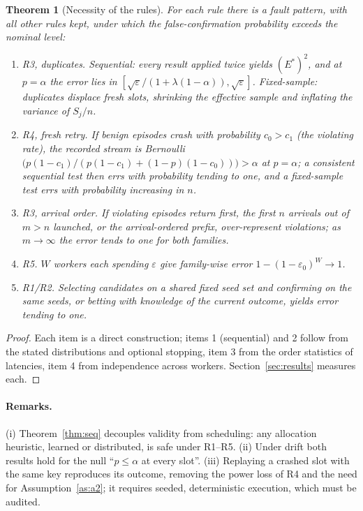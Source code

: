 \documentclass[11pt]{article}
\newtheorem{theorem}{Theorem}
\theoremstyle{definition}
\begin{document}
\begin{theorem}[Necessity of the rules]\label{thm:necessity}
For each rule there is a fault pattern, with all other rules kept, under which the false-confirmation probability exceeds the nominal level:
\begin{enumerate}
\item \emph{R3, duplicates.} Sequential: every result applied twice yields $(E^*)^2$, and at $p=\alpha$ the error lies in $[\sqrt\varepsilon/(1+\lambda(1-\alpha)),\sqrt\varepsilon]$. Fixed-sample: duplicates displace fresh slots, shrinking the effective sample and inflating the variance of $S_j/n$.
\item \emph{R4, fresh retry.} If benign episodes crash with probability $c_0>c_1$ (the violating rate), the recorded stream is Bernoulli$\bigl(p(1-c_1)/(p(1-c_1)+(1-p)(1-c_0))\bigr)>\alpha$ at $p=\alpha$; a consistent sequential test then errs with probability tending to one, and a fixed-sample test errs with probability increasing in $n$.
\item \emph{R3, arrival order.} If violating episodes return first, the first $n$ arrivals out of $m>n$ launched, or the arrival-ordered prefix, over-represent violations; as $m\to\infty$ the error tends to one for both families.
\item \emph{R5.} $W$ workers each spending $\varepsilon$ give family-wise error $1-(1-\varepsilon_0)^W\to1$.
\item \emph{R1/R2.} Selecting candidates on a shared fixed seed set and confirming on the same seeds, or betting with knowledge of the current outcome, yields error tending to one.
\end{enumerate}
\end{theorem}
\begin{proof}
Each item is a direct construction; items 1 (sequential) and 2 follow from the stated distributions and optional stopping, item 3 from the order statistics of latencies, item 4 from independence across workers. Section~\ref{sec:results} measures each.
\end{proof}

\paragraph{Remarks.} (i) Theorem~\ref{thm:seq} decouples validity from scheduling: any allocation heuristic, learned or distributed, is safe under R1--R5. (ii) Under drift both results hold for the null ``$p\le\alpha$ at every slot''. (iii) Replaying a crashed slot with the same key reproduces its outcome, removing the power loss of R4 and the need for Assumption~\ref{as:a2}; it requires seeded, deterministic execution, which must be audited.
\end{document}
